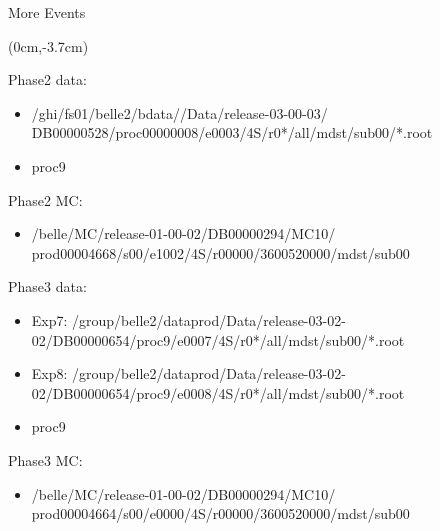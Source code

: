 \documentclass[8pt]{beamer}
\begin{document}
\begin{frame}{More Events}
	
	\begin{textblock*}{10cm}(0cm,-3.7cm)
		
		Phase2 data:
		\begin{itemize}
			\item /ghi/fs01/belle2/bdata//Data/release-03-00-03/
			DB00000528/proc00000008/e0003/4S/r0*/all/mdst/sub00/*.root
			\item proc9
		\end{itemize}
		Phase2 MC:
		
		\begin{itemize}
			\item /belle/MC/release-01-00-02/DB00000294/MC10/ prod00004668/s00/e1002/4S/r00000/3600520000/mdst/sub00
		\end{itemize}
		
		
		Phase3 data:
		\begin{itemize}
			\item Exp7: /group/belle2/dataprod/Data/release-03-02-02/DB00000654/proc9/e0007/4S/r0*/all/mdst/sub00/*.root
			\item Exp8: /group/belle2/dataprod/Data/release-03-02-02/DB00000654/proc9/e0008/4S/r0*/all/mdst/sub00/*.root
			
			\item proc9
		\end{itemize}
		
		Phase3 MC:
		
		\begin{itemize}
			\item /belle/MC/release-01-00-02/DB00000294/MC10/ prod00004664/s00/e0000/4S/r00000/3600520000/mdst/sub00
		\end{itemize}
		
		
		
		
		
		
	\end{textblock*}
	
	
	
	
	
	
\end{frame}
\end{document}
